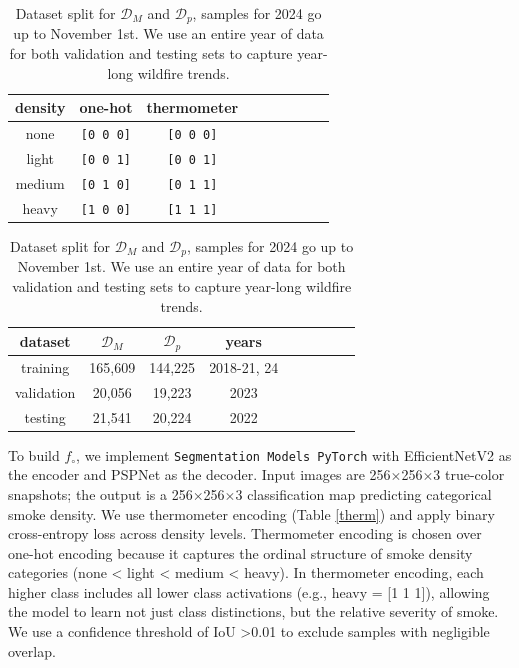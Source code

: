 \documentclass{article}
\begin{document}
\begin{table}[!htb]
\parbox{.45\linewidth}{
\centering
    \caption{A comparison of how smoke density would be represented by one-hot encoding commonly used for categorical data to thermometer encoding often used for ordinal data.}\label{therm}
    \begin{tabular}{ccccrrcrc}
        \toprule
        density & one-hot & thermometer \\
        \midrule
        none & \texttt{[0 0 0]} & \texttt{[0 0 0]} \\
        light  & \texttt{[0 0 1]} & \texttt{[0 0 1]} \\
        medium & \texttt{[0 1 0]} & \texttt{[0 1 1]} \\
        heavy  & \texttt{[1 0 0]} & \texttt{[1 1 1]} \\
        \bottomrule
    \end{tabular}
}
\hspace{.4cm}
\parbox{.5\linewidth}{
    \caption{Dataset split for \(\mathcal{D}_M\) and \(\mathcal{D}_p\), samples for 2024 go up to November 1st. We use an entire year of data for both validation and testing sets to capture year-long wildfire trends.}\label{split}
    \centering
    \begin{tabular}{ccccrrcrc}
        \toprule
        dataset & \(\mathcal{D}_M\) & \(\mathcal{D}_p\) &years\\
        \midrule
        training & 165,609 & 144,225 &2018-21, 24\\
        validation & 20,056 & 19,223 &2023 \\
        testing & 21,541 & 20,224 & 2022 \\
        \bottomrule
    \end{tabular}
}
\end{table}

To build \(f_{\circ}\), we implement \texttt{Segmentation Models PyTorch} \cite{semantic} with EfficientNetV2 \cite{efficientnetv2} as the encoder and PSPNet \cite{pspnet} as the decoder. Input images are 256\(\times\)256\(\times\)3 true-color snapshots; the output is a 256\(\times\)256\(\times\)3 classification map predicting categorical smoke density. We use thermometer encoding (Table \ref{therm}) and apply binary cross-entropy loss across density levels. Thermometer encoding is chosen over one-hot encoding because it captures the ordinal structure of smoke density categories (none < light < medium < heavy). In thermometer encoding, each higher class includes all lower class activations (e.g., heavy = [1 1 1]), allowing the model to learn not just class distinctions, but the relative severity of smoke. We use a confidence threshold of IoU  >0.01 \cite{conf_thresh} to exclude samples with negligible overlap. 
\end{document}
